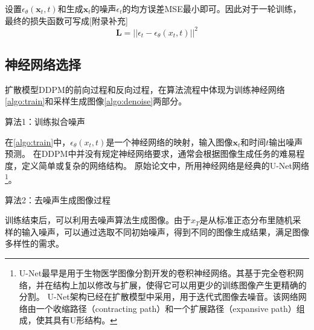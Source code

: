设置$\epsilon_{\theta}(\mathbf{x}_t,t)$和生成$\mathbf{x}_t$的噪声$\epsilon_t$的均方误差MSE最小即可。因此对于一轮训练，最终的损失函数可写成[附录补充]
\begin{equation}
    \mathbf{L}=\big|\big|\epsilon_t-\epsilon_{\theta}(x_t,t)\big|\big|^2
\end{equation}

\subsection{神经网络选择}
扩散模型DDPM的前向过程和反向过程，在算法流程中体现为训练神经网络\autoref{algo:train}和采样生成图像\autoref{algo:denoise}两部分。
\begin{algorithm}[h]
    \caption{算法1：训练拟合噪声}
    \label{algo:train}
\end{algorithm}
在\autoref{algo:train}中，$\epsilon_{\theta}(x_t,t)$是一个神经网络的映射，输入图像$\mathbf{x}_t$和时间$t$输出噪声预测。
在DDPM中并没有规定神经网络要求，通常会根据图像生成任务的难易程度，定义简单或复杂的网络结构。
原始论文中\cite{ho2020denoising}，所用神经网络是经典的U-Net网络
\footnote{U-Net最早是用于生物医学图像分割开发的卷积神经网络\cite{ronneberger2015u}。其基于完全卷积网络，并在结构上加以修改与扩展，使得它可以用更少的训练图像产生更精确的分割。
U-Net架构已经在扩散模型中采用，用于迭代式图像去噪音。该网络网络由一个收缩路径（contracting path）和一个扩展路径（expansive path）组成，使其具有U形结构。}。
\begin{algorithm}[h]
    \caption{算法2：去噪声生成图像过程}
    \label{algo:denoise}
\end{algorithm}

训练结束后，可以利用去噪声算法生成图像。由于$x_T$是从标准正态分布里随机采样的输入噪声，可以通过选取不同初始噪声，得到不同的图像生成结果，满足图像多样性的需求。